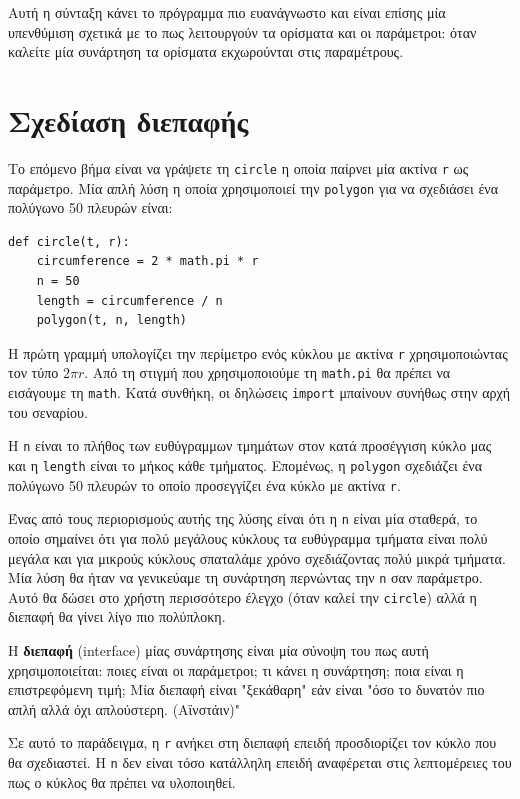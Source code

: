 \documentclass[10pt]{book}
\begin{document}
Αυτή η σύνταξη κάνει το πρόγραμμα πιο ευανάγνωστο και είναι επίσης μία υπενθύμιση σχετικά με το πως λειτουργούν τα ορίσματα και οι παράμετροι: όταν καλείτε μία συνάρτηση τα ορίσματα εκχωρούνται στις παραμέτρους.


\section{Σχεδίαση διεπαφής}

Το επόμενο βήμα είναι να γράψετε τη {\tt circle} η οποία παίρνει μία ακτίνα {\tt r} ως παράμετρο. Μία απλή λύση η οποία χρησιμοποιεί την {\tt polygon} για να σχεδιάσει ένα πολύγωνο 50 πλευρών είναι:


\begin{verbatim}
def circle(t, r):
    circumference = 2 * math.pi * r
    n = 50
    length = circumference / n
    polygon(t, n, length)
\end{verbatim}
%

Η πρώτη γραμμή υπολογίζει την περίμετρο ενός κύκλου με ακτίνα {\tt r} 
χρησιμοποιώντας τον τύπο  $2 \pi r$. Από τη στιγμή που χρησιμοποιούμε τη 
{\tt math.pi} θα πρέπει να εισάγουμε τη {\tt math}. Κατά συνθήκη, οι δηλώσεις
{\tt import} μπαίνουν συνήθως στην αρχή του σεναρίου.

Η {\tt n} είναι το πλήθος των ευθύγραμμων τμημάτων στον κατά προσέγγιση κύκλο μας και η {\tt length} είναι το μήκος κάθε τμήματος. Επομένως, η {\tt polygon} 
σχεδιάζει ένα πολύγωνο 50 πλευρών το οποίο προσεγγίζει ένα κύκλο με ακτίνα  {\tt r}. 

Ένας από τους περιορισμούς αυτής της λύσης είναι ότι η  {\tt n}  είναι μία σταθερά, το οποίο σημαίνει ότι για πολύ μεγάλους κύκλους τα ευθύγραμμα τμήματα είναι πολύ μεγάλα και για μικρούς κύκλους σπαταλάμε χρόνο σχεδιάζοντας πολύ μικρά τμήματα. Μία λύση θα ήταν να γενικεύαμε τη συνάρτηση περνώντας την {\tt n} σαν παράμετρο. Αυτό θα δώσει στο χρήστη περισσότερο έλεγχο (όταν καλεί την {\tt circle}) αλλά η διεπαφή θα γίνει λίγο πιο πολύπλοκη.

Η {\bf διεπαφή} (interface) μίας συνάρτησης είναι μία σύνοψη του πως αυτή χρησιμοποιείται: ποιες είναι οι παράμετροι; τι κάνει η συνάρτηση; ποια είναι η επιστρεφόμενη τιμή; Μία διεπαφή είναι "ξεκάθαρη" εάν είναι "όσο το δυνατόν πιο απλή αλλά όχι απλούστερη. (Αϊνστάιν)"

Σε αυτό το παράδειγμα, η {\tt r} ανήκει στη διεπαφή επειδή προσδιορίζει τον κύκλο που θα σχεδιαστεί. Η {\tt n} δεν είναι τόσο κατάλληλη επειδή αναφέρεται στις λεπτομέρειες του πως ο κύκλος θα πρέπει να υλοποιηθεί.
\end{document}
